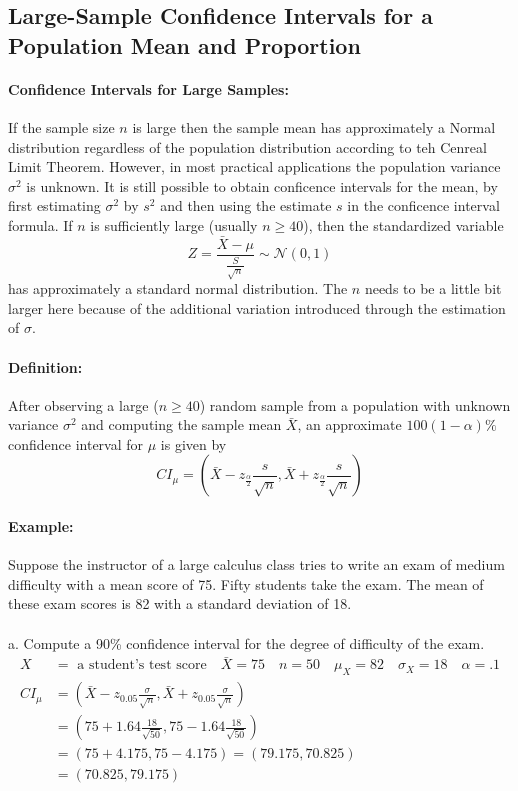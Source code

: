 \subsection{Large-Sample Confidence Intervals for a Population Mean and Proportion}
\hrulefill

\paragraph*{Confidence Intervals for Large Samples:}
If the sample size $n$ is large then the sample mean has approximately a Normal distribution regardless of the 
population distribution according to teh Cenreal Limit Theorem. However, in most practical applications 
the population variance $\sigma^2$ is unknown. It is still possible to obtain conficence intervals for the 
mean, by first estimating $\sigma^2$ by $s^2$ and then using the estimate $s$ in the conficence interval formula.
If $n$ is sufficiently large (usually $n \geq 40$), then the standardized variable
\[
    Z = \frac{\bar{X} - \mu}{\frac{S}{\sqrt{n}}} \sim \mathcal{N}(0,1)
\]
has approximately a standard normal distribution. The $n$ needs to be a little bit larger here 
because of the additional variation introduced through the estimation of $\sigma$.

\paragraph*{Definition:}
After observing a large ($n \geq 40$) random sample from a population with unknown variance $\sigma^2$ and computing the sample mean $\bar{X}$,
an approximate $100(1-\alpha)\%$ confidence interval for $\mu$ is given by
\[
    CI_\mu = (\bar{X} - z_{\frac{\alpha}{2}} \frac{s}{\sqrt{n}}, \bar{X} + z_{\frac{\alpha}{2}} \frac{s}{\sqrt{n}})
\]

\paragraph*{Example:} 
Suppose the instructor of a large calculus class tries to write an exam of medium difficulty with a mean score of 75.
Fifty students take the exam. The mean of these exam scores is 82 with a standard deviation of 18.\\
\\
a. Compute a 90\% confidence interval for the degree of difficulty of the exam.
\begin{align*}
    X &= \text{ a student's test score} \quad \bar{X} = 75 \quad n = 50 \quad \mu_X = 82 \quad \sigma_X = 18 \quad \alpha = .1\\
    CI_\mu &= (\bar{X} - z_0.05 \frac{\sigma}{\sqrt{n}}, \bar{X} + z_0.05 \frac{\sigma}{\sqrt{n}})\\
    &= (75 + 1.64 \frac{18}{\sqrt{50}}, 75 - 1.64 \frac{18}{\sqrt{50}})\\
    &= (75 + 4.175, 75 - 4.175) = (79.175, 70.825)\\
    &= (70.825, 79.175)
\end{align*}

